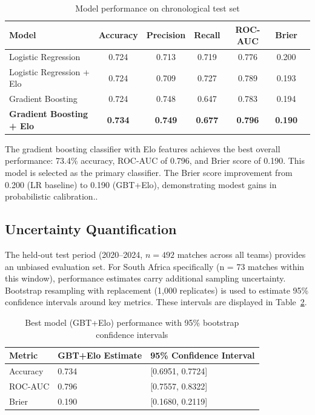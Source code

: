 \documentclass[12pt,a4paper,onecolumn]{article}
\renewcommand{\arraystretch}{1}
\begin{document}
\begin{table}[H]
\centering
\caption{Model performance on chronological test set}
\label{tab:results}
\footnotesize
\begin{tabularx}{\textwidth}{lcccccc}
\toprule
\textbf{Model} & \textbf{Accuracy} & \textbf{Precision} & \textbf{Recall} & \textbf{ROC-AUC} & \textbf{Brier} \\
\midrule
Logistic Regression & 0.724 & 0.713 & 0.719 & 0.776 & 0.200 \\
Logistic Regression + Elo & 0.724 & 0.709 & 0.727 & 0.789 & 0.193 \\
Gradient Boosting & 0.724 & 0.748 & 0.647 & 0.783 & 0.194 \\
\textbf{Gradient Boosting + Elo} & \textbf{0.734} & \textbf{0.749} & \textbf{0.677} & \textbf{0.796} & \textbf{0.190} \\
\bottomrule
\end{tabularx}
\end{table}

The gradient boosting classifier with Elo features achieves the best overall performance: 73.4\% accuracy, ROC-AUC of 0.796, and Brier score of 0.190. This model is selected as the primary classifier. The Brier score improvement from 0.200 (LR baseline) to 0.190 (GBT+Elo), demonstrating modest gains in probabilistic calibration..

\subsection{Uncertainty Quantification}
The held-out test period (2020--2024, $n=492$ matches across all teams) provides an unbiased evaluation set. For South Africa specifically (n = 73 matches within this window), performance estimates carry additional sampling uncertainty. Bootstrap resampling with replacement (1,000 replicates) is used to estimate 95\% confidence intervals around key metrics. These intervals are displayed in Table~\ref{tab:ci-metrics}.


\begin{table}[H]
\centering
\caption{Best model (GBT+Elo) performance with 95\% bootstrap confidence intervals}
\label{tab:ci-metrics}
\footnotesize
\setlength{\tabcolsep}{12pt}
\renewcommand{\arraystretch}{1.3}
\begin{tabularx}{\textwidth}{lXX}
\toprule
\textbf{Metric} & \textbf{GBT+Elo Estimate} & \textbf{95\% Confidence Interval} \\
\midrule
Accuracy & 0.734 & [0.6951, 0.7724] \\
ROC-AUC  & 0.796 & [0.7557, 0.8322] \\
Brier    & 0.190 & [0.1680, 0.2119] \\
\bottomrule
\end{tabularx}
\end{table}
\end{document}
